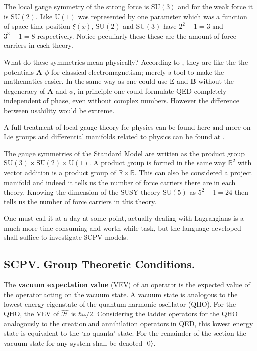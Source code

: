 \documentclass[floatfix,aps,prd,amsmath,amssymb]{revtex4}
\begin{document}
The local gauge symmetry of the strong force is $\mathrm{SU}(3)$ and for the weak force it is $\mathrm{SU}(2)$. Like $\mathrm{U}(1)$ was represented by one parameter which was a function of space-time position $\xi(x)$, $\mathrm{SU}(2)$ and $\mathrm{SU}(3)$ have $2^2-1=3$ and $3^3-1=8$ respectively. Notice peculiarly these these are the amount of force carriers in each theory.

What do these symmetries mean physically? According to \cite{SCPV6}, they are like the the potentials $\mathbf{A}, \phi$ for classical electromagnetism; merely a tool to make the mathematics easier. In the same way as one could use $\mathbf{E}$ and $\mathbf{B}$ without the degeneracy of $\mathbf{A}$ and $\phi$, in principle one could formulate QED completely independent of phase, even without complex numbers.
However the difference between usability would be extreme.


A full treatment of local gauge theory for physics can be found here \cite{SCPV6} and more on Lie groups and differential manifolds related to physics can be found at \cite{SCPV3}. 

The gauge symmetries of the Standard Model are written as the product group $\mathrm{SU}(3)\times \mathrm{SU}(2)\times \mathrm{U}(1)$. A product group is formed in the same way $\mathbb{R}^2$ with vector addition is a product group of $\mathbb{R}\times\mathbb{R}$. This can also be considered a project manifold and indeed it tells us the number of force carriers there are in each theory. Knowing the dimension of the SUSY theory $\mathrm{SU}(5)$ as $5^2-1 = 24$ then tells us the number of force carriers in this theory.

One must call it at a day at some point, actually dealing with Lagrangians is a much more time consuming and worth-while task, but the language developed shall suffice to investigate SCPV models.

\subsection{SCPV. Group Theoretic Conditions.}
The \textbf{vacuum expectation value} (VEV) of an operator is the expected value of the operator acting on the vacuum state. A vacuum state is analogous to the lowest energy eigenstate of the quantum harmonic oscillator (QHO). For the QHO, the VEV of $\hat{\mathcal{H}}$ is $\hbar \omega /2$. Considering the ladder operators for the QHO analogously to the creation and annihilation operators in QED, this lowest energy state is equivalent to the `no quanta' state. For the remainder of the section the vacuum state for any system shall be denoted  $\ket{0}$.
\end{document}
